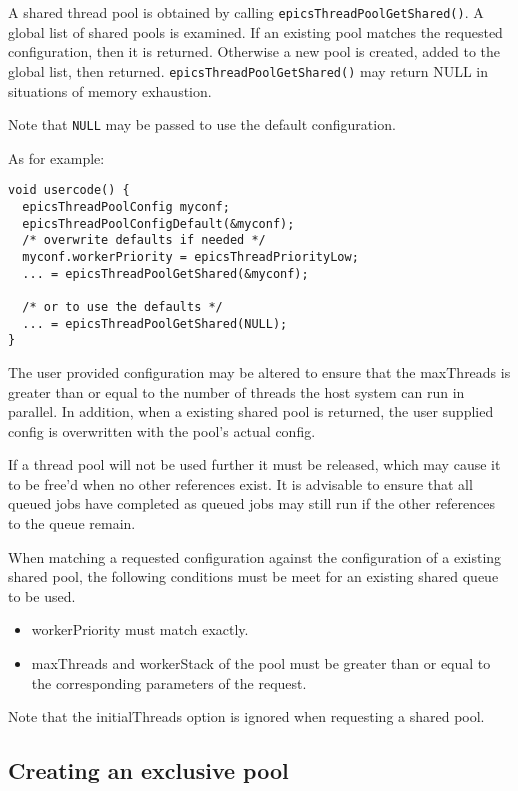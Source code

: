 
A shared thread pool is obtained by calling \verb|epicsThreadPoolGetShared()|.
A global list of shared pools is examined. If an existing pool matches
the requested configuration, then it is returned. Otherwise a new
pool is created, added to the global list, then returned. \verb|epicsThreadPoolGetShared()|
may return NULL in situations of memory exhaustion.

Note that \verb|NULL| may be passed to use the default configuration.

As for example:

\begin{verbatim}
void usercode() {
  epicsThreadPoolConfig myconf;
  epicsThreadPoolConfigDefault(&myconf);
  /* overwrite defaults if needed */
  myconf.workerPriority = epicsThreadPriorityLow;
  ... = epicsThreadPoolGetShared(&myconf);

  /* or to use the defaults */
  ... = epicsThreadPoolGetShared(NULL);
}
\end{verbatim}

The user provided configuration may be altered to ensure that the
maxThreads is greater than or equal to the number of threads the host
system can run in parallel. In addition, when a existing shared pool
is returned, the user supplied config is overwritten with the pool's
actual config.

If a thread pool will not be used further it must be released, which
may cause it to be free'd when no other references exist.
It is advisable to ensure that all queued
jobs have completed as queued jobs may still run if the other references
to the queue remain.

When matching a requested configuration against the configuration
of a existing shared pool, the following conditions must be meet
for an existing shared queue to be used.
\begin{itemize}
\item workerPriority must match exactly.
\item maxThreads and workerStack of the pool must be greater than or equal
to the corresponding parameters of the request.
\end{itemize}

Note that the initialThreads option is ignored when requesting a shared pool.

\subsection{Creating an exclusive pool}

